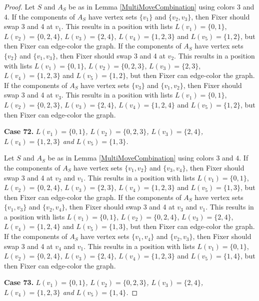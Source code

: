 \documentclass[12pt]{amsart}
\theoremstyle{plain}
\theoremstyle{definition}
\theoremstyle{remark}
\begin{document}
\begin{proof}
Let $S$ and $A_S$ be as in Lemma \ref{MultiMoveCombination} using colors $3$ and $4$. If the components of $A_S$ have vertex sets $\{v_1\}$ and $\{v_2, v_3\}$, then Fixer should swap 3 and 4 at $v_1$. This results in a position with lists $L(v_1) = \{0, 1\}$, $L(v_2) = \{0, 2, 4\}$, $L(v_3) = \{2, 4\}$, $L(v_4) = \{1, 2, 3\}$ and $L(v_5) = \{1, 2\}$, but then Fixer can edge-color the graph.
If the components of $A_S$ have vertex sets $\{v_2\}$ and $\{v_1, v_3\}$, then Fixer should swap 3 and 4 at $v_2$. This results in a position with lists $L(v_1) = \{0, 1\}$, $L(v_2) = \{0, 2, 3\}$, $L(v_3) = \{2, 3\}$, $L(v_4) = \{1, 2, 3\}$ and $L(v_5) = \{1, 2\}$, but then Fixer can edge-color the graph.
If the components of $A_S$ have vertex sets $\{v_3\}$ and $\{v_1, v_2\}$, then Fixer should swap 3 and 4 at $v_3$. This results in a position with lists $L(v_1) = \{0, 1\}$, $L(v_2) = \{0, 2, 3\}$, $L(v_3) = \{2, 4\}$, $L(v_4) = \{1, 2, 4\}$ and $L(v_5) = \{1, 2\}$, but then Fixer can edge-color the graph.

\noindent\textbf{Case 72.  }\textit{$L(v_1) = \{0, 1\}$, $L(v_2) = \{0, 2, 3\}$, $L(v_3) = \{2, 4\}$, $L(v_4) = \{1, 2, 3\}$ and $L(v_5) = \{1, 3\}$.}

Let $S$ and $A_S$ be as in Lemma \ref{MultiMoveCombination} using colors $3$ and $4$. If the components of $A_S$ have vertex sets $\{v_1, v_2\}$ and $\{v_3, v_4\}$, then Fixer should swap 3 and 4 at $v_2$ and $v_1$. This results in a position with lists $L(v_1) = \{0, 1\}$, $L(v_2) = \{0, 2, 4\}$, $L(v_3) = \{2, 3\}$, $L(v_4) = \{1, 2, 3\}$ and $L(v_5) = \{1, 3\}$, but then Fixer can edge-color the graph.
If the components of $A_S$ have vertex sets $\{v_1, v_3\}$ and $\{v_2, v_4\}$, then Fixer should swap 3 and 4 at $v_3$ and $v_1$. This results in a position with lists $L(v_1) = \{0, 1\}$, $L(v_2) = \{0, 2, 4\}$, $L(v_3) = \{2, 4\}$, $L(v_4) = \{1, 2, 4\}$ and $L(v_5) = \{1, 3\}$, but then Fixer can edge-color the graph.
If the components of $A_S$ have vertex sets $\{v_1, v_4\}$ and $\{v_2, v_3\}$, then Fixer should swap 3 and 4 at $v_4$ and $v_1$. This results in a position with lists $L(v_1) = \{0, 1\}$, $L(v_2) = \{0, 2, 4\}$, $L(v_3) = \{2, 4\}$, $L(v_4) = \{1, 2, 3\}$ and $L(v_5) = \{1, 4\}$, but then Fixer can edge-color the graph.

\noindent\textbf{Case 73.  }\textit{$L(v_1) = \{0, 1\}$, $L(v_2) = \{0, 2, 3\}$, $L(v_3) = \{2, 4\}$, $L(v_4) = \{1, 2, 3\}$ and $L(v_5) = \{1, 4\}$.}


\end{proof}
\end{document}
